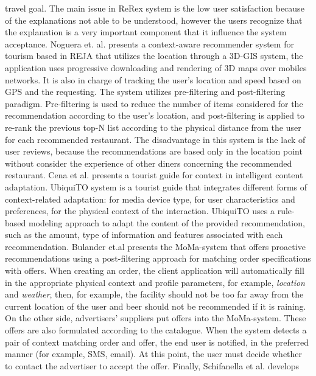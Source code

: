 travel goal. The main issue in ReRex system is the low user
satisfaction because of the explanations not able to be understood,
however the users recognize that the explanation is a very important
component that it influence the system acceptance. Noguera et. al.
\cite{noguera2012mobile} presents a context-aware recommender system
for tourism based in REJA that utilizes the location through a 3D-GIS
system, the application uses progressive downloading and rendering of
3D maps over mobiles networks. It is also in charge of tracking the
user’s location and speed based on GPS and the requesting. The system
utilizes pre-filtering and post-filtering paradigm. Pre-filtering is
used to reduce the number of items considered for the recommendation
according to the user’s location, and  post-filtering is applied to
re-rank the previous top-N list according to the physical distance
from the user for each recommended restaurant. The disadvantage in this
system is the lack of user reviews, because the recommendations are
based only in the location point without consider the experience of
other diners concerning the recommended restaurant. 
Cena et al.\cite{cena2006integrating} presents a tourist guide for
context in intelligent content adaptation. UbiquiTO system is a
tourist guide that integrates different forms of context-related
adaptation: for media device type, for user characteristics and
preferences, for the physical context of the interaction. UbiquiTO uses
a rule-based modeling approach to adapt the content of the provided
recommendation, such as the amount, type of information and features
associated with each recommendation. 
Bulander et.al\cite{bulander2005comparison} presents the MoMa-system that
offers proactive recommendations using a post-filtering approach for
matching order specifications with offers. When creating an order, the
client application will automatically fill in the appropriate physical
context and profile parameters, for example, \textit{location} and \textit{weather},
then, for example, the facility should not be too far away from the
current location of the user and beer should not be
recommended if it is raining. On the other side, advertisers’
suppliers put offers into the MoMa-system. These offers are also
formulated according to the catalogue. When the system detects a pair
of context matching order and offer, the end user is notified, in the
preferred manner (for example, SMS, email). At this point, the user
must decide whether to contact the advertiser to accept the offer.
Finally, Schifanella et al.\cite{schifanella2008mobhinter} develops
